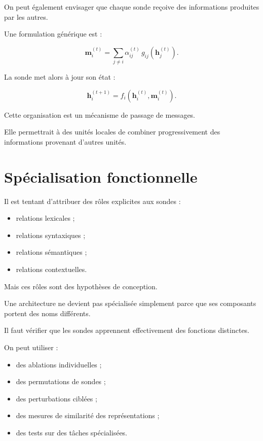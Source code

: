 \documentclass[11pt,a4paper]{report}
\newcommand{\vect}[1]{\bm{#1}}
\begin{document}
On peut également envisager que chaque sonde reçoive
des informations produites par les autres.

Une formulation générique est :

\[
\vect{m}_i^{(t)}
=
\sum_{j\neq i}
\alpha_{ij}^{(t)}
\,g_{ij}(\vect{h}_j^{(t)}).
\]

La sonde met alors à jour son état :

\[
\vect{h}_i^{(t+1)}
=
f_i\left(
\vect{h}_i^{(t)},
\vect{m}_i^{(t)}
\right).
\]

Cette organisation est un mécanisme de passage de messages.

Elle permettrait à des unités locales de combiner
progressivement des informations provenant d'autres unités.

\section{Spécialisation fonctionnelle}

Il est tentant d'attribuer des rôles explicites aux sondes :

\begin{itemize}
  \item relations lexicales ;
  \item relations syntaxiques ;
  \item relations sémantiques ;
  \item relations contextuelles.
\end{itemize}

Mais ces rôles sont des hypothèses de conception.

Une architecture ne devient pas spécialisée simplement
parce que ses composants portent des noms différents.

Il faut vérifier que les sondes apprennent effectivement
des fonctions distinctes.

On peut utiliser :

\begin{itemize}
  \item des ablations individuelles ;
  \item des permutations de sondes ;
  \item des perturbations ciblées ;
  \item des mesures de similarité des représentations ;
  \item des tests sur des tâches spécialisées.
\end{itemize}

\end{document}
